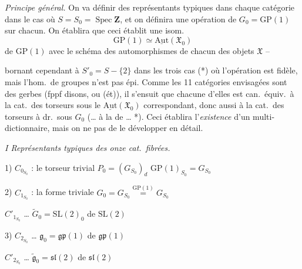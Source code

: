 \documentclass[11pt,a4paper]{article}
\begin{document}
\emph{Principe général.} On va définir des représentants typiques dans chaque
catégorie dans le cas où $S = S_0 = \operatorname{Spec} \mathbf{Z}$, et on
définira une opération de $G_0 = \mathrm{GP}(1)$ sur chacun.
On établira que ceci établit une isom.
\[
  \mathrm{GP}(1) \simeq \underline{\mathrm{Aut}}(\mathfrak{X}_0)
\]
de $\mathrm{GP}(1)$ avec le schéma des automorphismes de chacun des objets
$\mathfrak{X}$  -- \ill{}

bornant cependant à \struck{\ill{}} $S'_0 = S - \lbrace 2 \rbrace$ dans les trois
cas (*) où l'opération  est fidèle, mais l'hom.\ de groupes
 n'est pas épi.
Comme les 11 catégories  envisagées sont des gerbes (fppf disons,
ou (ét)), il s'ensuit que chacune d'elles est can.\ équiv.\ à la cat.\ des
torseurs  sous le $\underline{\mathrm{Aut}}(\mathfrak{X}_0)$
correspondant, donc aussi à la cat.\ des torseurs à dr.\ sous $G_0$ (\ldots{} à
la  de  \ldots{} *). Ceci établira
l'\emph{existence} d'un multi-dictionnaire, mais on \uncertain{\ill{}} ne
 pas de le développer en détail.

\emph{I Représentants typiques des onze cat.\ fibrées.}

1) $C_{0_{S_0}}$ : le torseur trivial $P_0 = (G_{S_0})_d$  $\mathrm{GP}(1)_{S_0} = G_{S_0}$

2) $C_{1_{S_0}}$ : la forme triviale $G_0 = G_{S_0} \overset{\mathrm{GP}(1)}{=} G_{S_0}$

\quad $C'_{1_{S_0}}$ \ldots{} $\widetilde{G}_0 = \mathrm{SL}(2)_0$ de $\mathrm{SL}(2)$


3) $C_{2_{S_0}}$ \ldots{} $\mathfrak{g}_0 = \mathfrak{gp}(1)$ de $\mathfrak{gp}(1)$

\quad $C'_{2_{S_0}}$ \ldots{} $\widetilde{\mathfrak{g}}_0 = \mathfrak{sl}(2)$ de $\mathfrak{sl}(2)$

\end{document}
